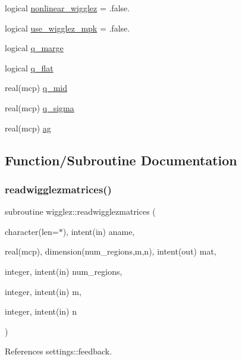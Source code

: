 \begin{DoxyCompactItemize}
logical \mbox{\hyperlink{namespacewigglez_aa2c47840239c6c778e9459f43cb8d02b}{nonlinear\+\_\+wigglez}} = .false.
\item 
logical \mbox{\hyperlink{namespacewigglez_a3827c735a7a159656e581a2e19c567a2}{use\+\_\+wigglez\+\_\+mpk}} = .false.
\item 
logical \mbox{\hyperlink{namespacewigglez_aa9c3ad74ce4e69f0fcccd8fdda77186e}{q\+\_\+marge}}
\item 
logical \mbox{\hyperlink{namespacewigglez_a60066dbf058902563e14f3196a4bd03b}{q\+\_\+flat}}
\item 
real(mcp) \mbox{\hyperlink{namespacewigglez_a9d61faf004a432ee806221f52cbabd61}{q\+\_\+mid}}
\item 
real(mcp) \mbox{\hyperlink{namespacewigglez_adecc221b2b57fa0a89ada696e24823d9}{q\+\_\+sigma}}
\item 
real(mcp) \mbox{\hyperlink{namespacewigglez_a873b48387a22b04846288e5f2d19af1f}{ag}}
\end{DoxyCompactItemize}


\subsection{Function/\+Subroutine Documentation}
\mbox{\label{namespacewigglez_af7eacad18112700eeba576ce8376cb89}} 
\subsubsection{\texorpdfstring{readwigglezmatrices()}{readwigglezmatrices()}}
{\footnotesize\ttfamily subroutine wigglez\+::readwigglezmatrices (\begin{DoxyParamCaption}\item[{character(len=$\ast$), intent(in)}]{aname,  }\item[{real(mcp), dimension(num\+\_\+regions,m,n), intent(out)}]{mat,  }\item[{integer, intent(in)}]{num\+\_\+regions,  }\item[{integer, intent(in)}]{m,  }\item[{integer, intent(in)}]{n }\end{DoxyParamCaption})\hspace{0.3cm}{\ttfamily [private]}}



References settings\+::feedback.



